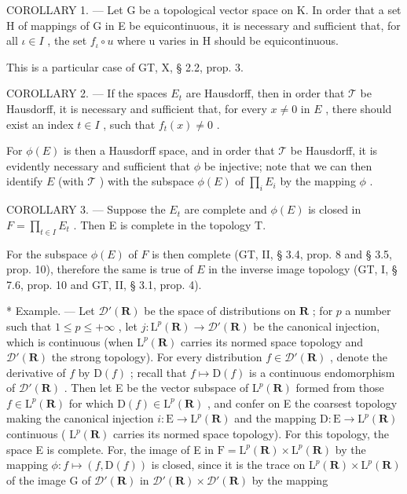 COROLLARY 1. --- Let G be a topological vector space on K. In order that a set H of mappings of G in E be equicontinuous, it is necessary and sufficient that, for all \(\iota \in I\) , the set \(f_{\iota} \circ u\) where u varies in H should be equicontinuous.

This is a particular case of GT, X, § 2.2, prop. 3.

COROLLARY 2. --- If the spaces \(E_{t}\) are Hausdorff, then in order that \(\mathcal{T}\) be Hausdorff, it is necessary and sufficient that, for every \(x \neq 0\) in \(E\) , there should exist an index \(t \in I\) , such that \(f_{t}(x) \neq 0\) .

For \(\phi(E)\) is then a Hausdorff space, and in order that \(\mathcal{T}\) be Hausdorff, it is evidently necessary and sufficient that \(\phi\) be injective; note that we can then identify \(E\) (with \(\mathcal{T}\) ) with the subspace \(\phi(E)\) of \(\prod_{i} E_{i}\) by the mapping \(\phi\) .

COROLLARY 3. --- Suppose the \(E_{t}\) are complete and \(\phi(E)\) is closed in \(F = \prod_{t \in I} E_{t}\) . Then E is complete in the topology T.

For the subspace \(\phi(E)\) of \(F\) is then complete (GT, II, § 3.4, prop. 8 and § 3.5, prop. 10), therefore the same is true of \(E\) in the inverse image topology (GT, I, § 7.6, prop. 10 and GT, II, § 3.1, prop. 4).

* Example. --- Let \(\mathcal{D}'(\mathbf{R})\) be the space of distributions on \(\mathbf{R}\) ; for \(p\) a number such that \(1 \leqslant p \leqslant +\infty\) , let \(j: \mathrm{L}^p(\mathbf{R}) \to \mathcal{D}'(\mathbf{R})\) be the canonical injection, which is continuous (when \(\mathrm{L}^p(\mathbf{R})\) carries its normed space topology and \(\mathcal{D}'(\mathbf{R})\) the strong topology). For every distribution \(f \in \mathcal{D}'(\mathbf{R})\) , denote the derivative of \(f\) by \(\mathrm{D}(f)\) ; recall that \(f \mapsto \mathrm{D}(f)\) is a continuous endomorphism of \(\mathcal{D}'(\mathbf{R})\) . Then let E be the vector subspace of \(\mathrm{L}^p(\mathbf{R})\) formed from those \(f \in \mathrm{L}^p(\mathbf{R})\) for which \(\mathrm{D}(f) \in \mathrm{L}^p(\mathbf{R})\) , and confer on E the coarsest topology making the canonical injection \(i: \mathrm{E} \to \mathrm{L}^p(\mathbf{R})\) and the mapping \(\mathrm{D}: \mathrm{E} \to \mathrm{L}^p(\mathbf{R})\) continuous ( \(\mathrm{L}^p(\mathbf{R})\) carries its normed space topology). For this topology, the space E is complete. For, the image of E in \(\mathrm{F} = \mathrm{L}^p(\mathbf{R}) \times \mathrm{L}^p(\mathbf{R})\) by the mapping \(\phi: f \mapsto (f, \mathrm{D}(f))\) is closed, since it is the trace on \(\mathrm{L}^p(\mathbf{R}) \times \mathrm{L}^p(\mathbf{R})\) of the image G of \(\mathcal{D}'(\mathbf{R})\) in \(\mathcal{D}'(\mathbf{R}) \times \mathcal{D}'(\mathbf{R})\) by the mapping


